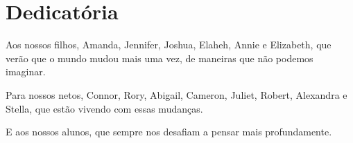 \chapter{Dedicatória}
\label{chap:dedicatoria}


\vspace{3cm}
Aos nossos filhos, Amanda, Jennifer, Joshua, Elaheh, Annie e Elizabeth, que
verão que o mundo mudou mais uma vez, de maneiras que não podemos imaginar.

\vspace{1cm}
\noindent Para nossos netos, Connor, Rory, Abigail, Cameron, Juliet, Robert,
Alexandra e Stella, que estão vivendo com essas mudanças.

\vspace{1cm}
\noindent E aos nossos alunos, que sempre nos desafiam a pensar mais
profundamente.
